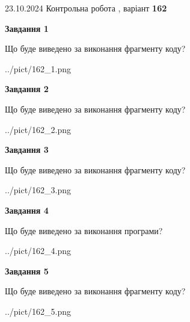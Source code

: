 \documentclass[12pt, ukrainian]{article}
\begin{document}
{\Large{23.10.2024 Контрольна робота , варіант  \No \textbf { 162 }\par}}
{
\begin {large}
{\begin {center}\textbf{Завдання 1}\end {center}}

Що буде виведено за виконання фрагменту коду?\par
\begin{center}
	{../pict/162_1.png}
\end{center}
\newpage

{\begin {center}\textbf{Завдання 2}\end {center}}

Що буде виведено за виконання фрагменту коду?\par
\begin{center}
	{../pict/162_2.png}
\end{center}
\newpage

{\begin {center}\textbf{Завдання 3}\end {center}}

Що буде виведено за виконання фрагменту коду?\par
\begin{center}
	{../pict/162_3.png}
\end{center}
\newpage

{\begin {center}\textbf{Завдання 4}\end {center}}

Що буде виведено за виконання програми?\par
\begin{center}
	{../pict/162_4.png}
\end{center}
\newpage

{\begin {center}\textbf{Завдання 5}\end {center}}

Що буде виведено за виконання фрагменту коду?\par
\begin{center}
	{../pict/162_5.png}
\end{center}
\newpage


\end{large}}
\end{document}
